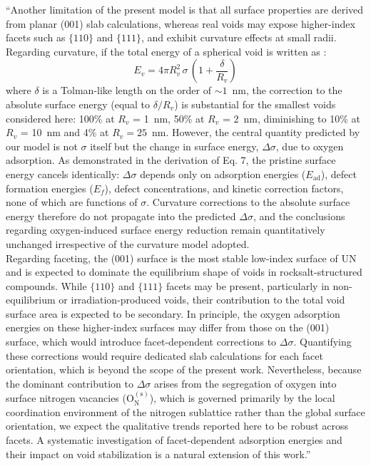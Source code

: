 \documentclass[12pt]{article}
\begin{document}
``Another limitation of the present model is that all surface properties are derived from planar (001) slab calculations, whereas real voids may expose higher-index facets such as $\{110\}$ and $\{111\}$, and exhibit curvature effects at small radii. Regarding curvature, if the total energy of a spherical void is written as \cite{Tolman1949,Chhapadia2011,Wang2021}:
\begin{equation}
E_v = 4 \pi R_v^2 \, \sigma \, \left(1 + \frac{\delta}{R_v} \right)    
\end{equation}
where $\delta$ is a Tolman-like length on the order of $\sim 1$~nm, the correction to the absolute surface energy (equal to $\delta/R_v$) is substantial for the smallest voids considered here: 100\% at $R_v$ = 1~nm, 50\% at $R_v$ = 2~nm, diminishing to 10\% at $R_v$ = 10~nm and 4\% at $R_v = 25$~nm. However, the central quantity predicted by our model is not $\sigma$ itself but the change in surface energy, $\Delta\sigma$, due to oxygen adsorption. As demonstrated in the derivation of Eq. 7, the pristine surface energy cancels identically: $\Delta\sigma$ depends only on adsorption energies ($E_\mathrm{ad}$), defect formation energies ($E_f$), defect concentrations, and kinetic correction factors, none of which are functions of $\sigma$. Curvature corrections to the absolute surface energy therefore do not propagate into the predicted $\Delta\sigma$, and the conclusions regarding oxygen-induced surface energy reduction remain quantitatively unchanged irrespective of the curvature model adopted.
\\

Regarding faceting, the (001) surface is the most stable low-index surface of UN and is expected to dominate the equilibrium shape of voids in rocksalt-structured compounds. While $\{110\}$ and $\{111\}$ facets may be present, particularly in non-equilibrium or irradiation-produced voids, their contribution to the total void surface area is expected to be secondary. In principle, the oxygen adsorption energies on these higher-index surfaces may differ from those on the (001) surface, which would introduce facet-dependent corrections to $\Delta\sigma$. Quantifying these corrections would require dedicated slab calculations for each facet orientation, which is beyond the scope of the present work. Nevertheless, because the dominant contribution to $\Delta\sigma$ arises from the segregation of oxygen into surface nitrogen vacancies (O$_\mathrm{N}^{(\mathrm{s})}$), which is governed primarily by the local coordination environment of the nitrogen sublattice rather than the global surface orientation, we expect the qualitative trends reported here to be robust across facets. A systematic investigation of facet-dependent adsorption energies and their impact on void stabilization is a natural extension of this work.'' \color{black}
\end{document}
